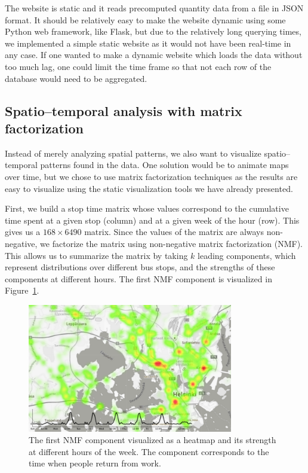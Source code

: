 \documentclass[a4paper,12pt]{article}
\begin{document}
The website is static and it reads precomputed quantity data from a file in 
JSON format. It should be relatively easy to make the website dynamic using 
some Python web framework, like Flask, but due to the relatively long querying 
times, we implemented a simple static website as it would not have been 
real-time in any case. If one wanted to make a dynamic website which loads the 
data without too much lag, one could limit the time frame so that not each row 
of the database would need to be aggregated.

\subsection{Spatio--temporal analysis with matrix factorization}

Instead of merely analyzing spatial patterns, we also want to visualize 
spatio--temporal patterns found in the data. One solution would be to animate 
maps over time, but we chose to use matrix factorization techniques as the 
results are easy to visualize using the static visualization tools we have
already presented.

First, we build a stop time matrix whose values correspond to the cumulative 
time spent at a given stop (column) and at a given week of the hour (row). This 
gives us a $168\times 6490$ matrix. Since the values of the matrix are always
non-negative, we factorize the matrix using non-negative matrix factorization 
(NMF). This allows us to summarize the matrix by taking $k$ leading components, 
which represent distributions over different bus stops, and the strengths 
of these components at different hours. The first NMF component is visualized 
in Figure~\ref{fig:nmf1}.

\begin{figure}
\centering
\includegraphics[width=0.8\textwidth]{nmf1.png}
\caption{The first NMF component visualized as a heatmap and its strength at 
different hours of the week. The component corresponds to the time when people 
return from work.}
\label{fig:nmf1}
\end{figure}
\end{document}
